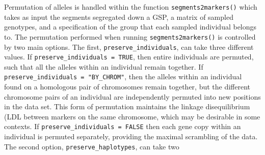 Permutation of alleles is handled within the \gscramble{} function {\footnotesize\tt segments2markers()}
which takes as input the segments segregated down a GSP, a matrix of sampled genotypes, and a specification
of the group that each sampled individual belongs to.  The permutation performed when running
{\footnotesize\tt segments2markers()} is controlled by two main options.  The first, {\tt\footnotesize preserve\_individuals},
can take three different values.  If {\tt\footnotesize preserve\_individuals = TRUE}, then entire individuals are permuted,
such that all the alleles within an individual remain together.  If {\tt\footnotesize preserve\_individuals = "BY\_CHROM"}, then
the alleles within an individual found on a homologous pair of chromosomes remain together, but the different
chromosome pairs of an individual are independently permuted into new positions in the data set.  This form of permutation
maintains the linkage disequilibrium (LDL between markers on the same chromosome, which may be desirable in some contexts.
If {\tt\footnotesize preserve\_individuals = FALSE} then each gene copy within an individual is permuted separately,
providing the maximal scrambling of the data. The second option, {\tt\footnotesize preserve\_haplotypes}, can take two
